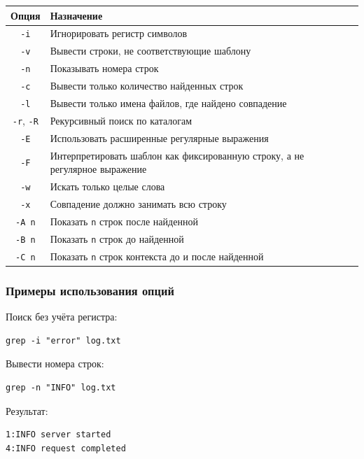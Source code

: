 \documentclass[12pt,a4paper]{article}
\begin{document}
\begin{center}
\begin{tabular}{|c|p{10cm}|}
\hline
Опция & Назначение \\
\hline
\texttt{-i} & Игнорировать регистр символов \\
\hline
\texttt{-v} & Вывести строки, не соответствующие шаблону \\
\hline
\texttt{-n} & Показывать номера строк \\
\hline
\texttt{-c} & Вывести только количество найденных строк \\
\hline
\texttt{-l} & Вывести только имена файлов, где найдено совпадение \\
\hline
\texttt{-r}, \texttt{-R} & Рекурсивный поиск по каталогам \\
\hline
\texttt{-E} & Использовать расширенные регулярные выражения \\
\hline
\texttt{-F} & Интерпретировать шаблон как фиксированную строку, а не регулярное выражение \\
\hline
\texttt{-w} & Искать только целые слова \\
\hline
\texttt{-x} & Совпадение должно занимать всю строку \\
\hline
\texttt{-A n} & Показать \texttt{n} строк после найденной \\
\hline
\texttt{-B n} & Показать \texttt{n} строк до найденной \\
\hline
\texttt{-C n} & Показать \texttt{n} строк контекста до и после найденной \\
\hline
\end{tabular}
\end{center}

\subsubsection{Примеры использования опций}

Поиск без учёта регистра:

\begin{verbatim}
grep -i "error" log.txt
\end{verbatim}

Вывести номера строк:

\begin{verbatim}
grep -n "INFO" log.txt
\end{verbatim}

Результат:

\begin{verbatim}
1:INFO server started
4:INFO request completed
\end{verbatim}
\end{document}
